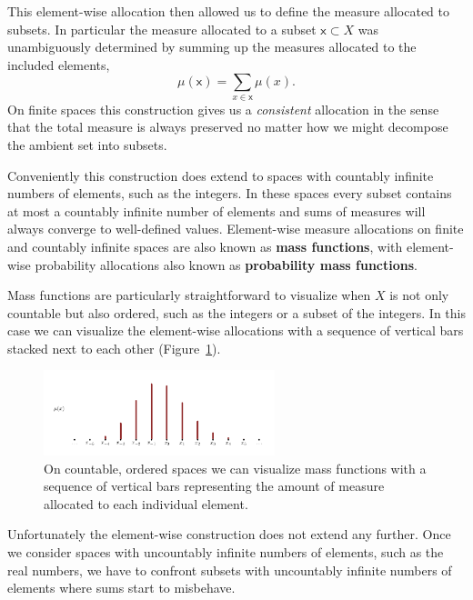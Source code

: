 \documentclass[
  letterpaper,
  DIV=11,
  numbers=noendperiod]{scrartcl}
\begin{document}
This element-wise allocation then allowed us to define the measure
allocated to subsets. In particular the measure allocated to a subset
\(\mathsf{x} \subset X\) was unambiguously determined by summing up the
measures allocated to the included elements, \[
\mu(\mathsf{x}) = \sum_{x \in \mathsf{x}} \mu(x).
\] On finite spaces this construction gives us a \emph{consistent}
allocation in the sense that the total measure is always preserved no
matter how we might decompose the ambient set into subsets.

Conveniently this construction does extend to spaces with countably
infinite numbers of elements, such as the integers. In these spaces
every subset contains at most a countably infinite number of elements
and sums of measures will always converge to well-defined values.
Element-wise measure allocations on finite and countably infinite spaces
are also known as \textbf{mass functions}, with element-wise probability
allocations also known as \textbf{probability mass functions}.

Mass functions are particularly straightforward to visualize when \(X\)
is not only countable but also ordered, such as the integers or a subset
of the integers. In this case we can visualize the element-wise
allocations with a sequence of vertical bars stacked next to each other
(Figure~\ref{fig-mass-function}).

\begin{figure}

{\centering \includegraphics[width=0.6\textwidth,height=\textheight]{figures/mass_function/mass_function.pdf}

}

\caption{\label{fig-mass-function}On countable, ordered spaces we can
visualize mass functions with a sequence of vertical bars representing
the amount of measure allocated to each individual element.}

\end{figure}

Unfortunately the element-wise construction does not extend any further.
Once we consider spaces with uncountably infinite numbers of elements,
such as the real numbers, we have to confront subsets with uncountably
infinite numbers of elements where sums start to misbehave.
\end{document}
